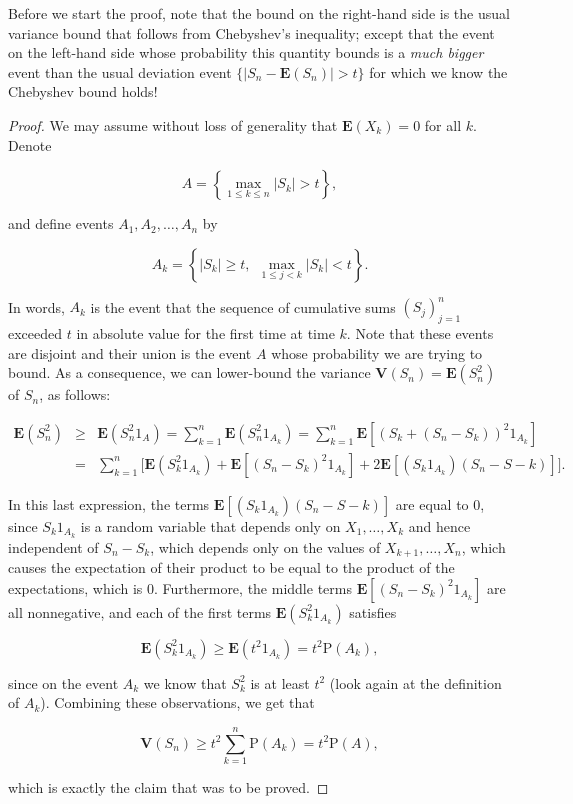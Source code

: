 \documentclass[11pt]{report}
\theoremstyle{plain}
\theoremstyle{definition}
\begin{document}
\noindent Before we start the proof, note that the bound on the
right-hand side is the usual variance bound that
follows from Chebyshev's inequality; except that the
event on the left-hand side whose probability this
quantity bounds is a \emph{much bigger} event than the
usual deviation event $\{|S_n-\mathbf{E}(S_n)|>t\}$
for which we know the Chebyshev bound holds!

\begin{proof}
We may assume without loss of generality that
$\mathbf{E}(X_k)=0$ for all $k$. Denote

\[
A = \left\{ \max_{1\le k\le n} |S_k| > t\right\},
\]

\noindent and define events $A_1,A_2,\ldots,A_n$ by

\[
A_k = \left\{ |S_k|\ge t, \ \ \max_{1\le j<k} |S_k|<t \right\}.
\]

\noindent In words, $A_k$ is the event that the sequence of
cumulative sums $(S_j)_{j=1}^n$ exceeded $t$ in
absolute value for the first time at time $k$. Note
that these events are disjoint and their union is the
event $A$ whose probability we are trying to bound.
As a consequence, we can lower-bound the variance
$\mathbf{V}(S_n)=\mathbf{E}(S_n^2)$ of $S_n$, as
follows:

\begin{eqnarray*}
\mathbf{E}(S_n^2) &\ge& \mathbf{E}(S_n^2 1_A) = \sum_{k=1}^n \mathbf{E} \left(S_n^2 1_{A_k}\right)
= \sum_{k=1}^n \mathbf{E} \left[ \left(S_k+(S_n-S_k)\right)^2 1_{A_k} \right] \\
&=&
\sum_{k=1}^n \Big[\mathbf{E} (S_k^2 1_{A_k}) + \mathbf{E}\left[ (S_n-S_k)^2 1_{A_k} \right]
+ 2 \mathbf{E} \left[(S_k 1_{A_k}) (S_n-S-k) \right] \Big].
\end{eqnarray*}

\noindent In this last expression, the terms
$\mathbf{E} \left[(S_k 1_{A_k}) (S_n-S-k) \right]$
are equal to $0$, since $S_k 1_{A_k}$ is a random
variable that depends only on $X_1,\ldots,X_k$ and
hence independent of $S_n-S_k$, which depends only on
the values of $X_{k+1},\ldots,X_n$, which causes the
expectation of their product to be equal to the
product of the expectations, which is 0. Furthermore,
the middle terms
$\mathbf{E}\left[ (S_n-S_k)^2 1_{A_k} \right]$ are
all nonnegative, and each of the first terms
$\mathbf{E} (S_k^2 1_{A_k})$ satisfies

\[
\mathbf{E} (S_k^2 1_{A_k}) \ge \mathbf{E} (t^2 1_{A_k}) = t^2 \mathrm{P}(A_k),
\]

\noindent since on the event $A_k$ we know that $S_k^2$ is at
least $t^2$ (look again at the definition of $A_k$).
Combining these observations, we get that

\[
\mathbf{V}(S_n)  \ge t^2\sum_{k=1}^n \mathrm{P}(A_k) = t^2 \mathrm{P}(A),
\]

\noindent which is exactly the claim that was to be proved.
\end{proof}
\end{document}
